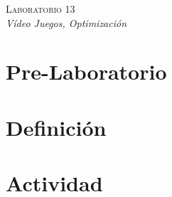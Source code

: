 \begin{center}
\textsc{\Large Laboratorio 13}~\\
\emph{\large Vídeo Juegos, Optimización}
\end{center}

\section{Pre-Laboratorio}

\section{Definición}


\section{Actividad}
